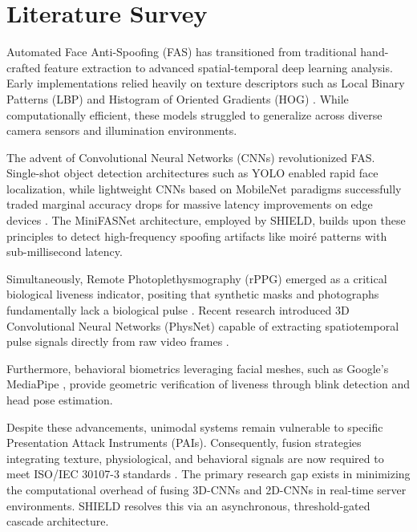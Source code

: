 \chapter{Literature Survey}

Automated Face Anti-Spoofing (FAS) has transitioned from traditional hand-crafted feature extraction to advanced spatial-temporal deep learning analysis. Early implementations relied heavily on texture descriptors such as Local Binary Patterns (LBP) and Histogram of Oriented Gradients (HOG) \cite{boulkenafet2015face}. While computationally efficient, these models struggled to generalize across diverse camera sensors and illumination environments.

The advent of Convolutional Neural Networks (CNNs) revolutionized FAS. Single-shot object detection architectures such as YOLO \cite{redmon2016you} enabled rapid face localization, while lightweight CNNs based on MobileNet paradigms successfully traded marginal accuracy drops for massive latency improvements on edge devices \cite{howard2017mobilenets}. The MiniFASNet architecture, employed by SHIELD, builds upon these principles to detect high-frequency spoofing artifacts like moiré patterns with sub-millisecond latency.

Simultaneously, Remote Photoplethysmography (rPPG) emerged as a critical biological liveness indicator, positing that synthetic masks and photographs fundamentally lack a biological pulse \cite{poh2010non}. Recent research introduced 3D Convolutional Neural Networks (PhysNet) capable of extracting spatiotemporal pulse signals directly from raw video frames \cite{yu2019remote}. 

Furthermore, behavioral biometrics leveraging facial meshes, such as Google's MediaPipe \cite{lugaresi2019mediapipe}, provide geometric verification of liveness through blink detection and head pose estimation. 

Despite these advancements, unimodal systems remain vulnerable to specific Presentation Attack Instruments (PAIs). Consequently, fusion strategies integrating texture, physiological, and behavioral signals are now required to meet ISO/IEC 30107-3 standards \cite{iso30107}. The primary research gap exists in minimizing the computational overhead of fusing 3D-CNNs and 2D-CNNs in real-time server environments. SHIELD resolves this via an asynchronous, threshold-gated cascade architecture.

